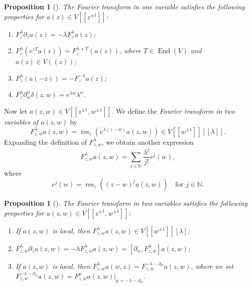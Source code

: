 \documentclass[a4paper, 12pt, reqno]{amsart}
\newtheorem{proposition}[theorem]{Proposition}
\theoremstyle{remark}
\DeclareMathOperator{\End}{End}
\DeclareMathOperator{\res}{res}
\begin{document}
\begin{proposition}[{\cite[Proposition 1.5.2]{nozaradan_introduction_2008}}]
  \label{prp:2}
  The Fourier transform in one variable satisfies the following properties for $a(z) \in V[[z^{\pm1}]]$:
  \begin{enumerate}
  \item $F^{\lambda}_z\partial_za(z) = -\lambda F^{\lambda}_za(z)$;
  \item $F^{\lambda}_z(e^{zT}a(z)) = F^{\lambda + T}_z(a(z))$, where $T \in \End(V)$ and $a(z) \in V((z))$;
  \item $F^{\lambda}_z(a(-z)) = -F^{-\lambda}_za(z)$;
  \item $F^{\lambda}_z\partial^n_w\delta(z, w) = e^{\lambda w}\lambda^n$.
  \end{enumerate}
\end{proposition}

Now let $a(z, w) \in V[[z^{\pm1}, w^{\pm1}]]$.
We define the \emph{Fourier transform in two variables of $a(z, w)$} by
\begin{equation*}
  F^{\lambda}_{z, w}a(z, w) = \res_z(e^{\lambda(z - w)}a(z, w)) \in V[[w^{\pm1}]][[\lambda]].
\end{equation*}
Expanding the definition of $F^{\lambda}_{z, w}$, we obtain another expression
\begin{equation*}
  F^{\lambda}_{z, w}a(z, w) = \sum_{j \in \mathbb{N}}\frac{\lambda^j}{j!}c^j(w),
\end{equation*}
where
\begin{equation*}
  c^j(w) = \res_z((z - w)^ja(z, w)) \quad \text{for $j \in \mathbb{N}$}.
\end{equation*}

\begin{proposition}[{\cite[Proposition 1.5.4]{nozaradan_introduction_2008}}]
  \label{prp:3}
  The Fourier transform in two variables satisfies the following properties for $a(z, w) \in V[[z^{\pm1}, w^{\pm1}]]$:
  \begin{enumerate}
  \item If $a(z, w)$ is local, then $F^{\lambda}_{z, w}a(z, w) \in V[[w^{\pm1}]][\lambda]$;
  \item $F^{\lambda}_{z, w}\partial_za(z, w) = -\lambda F^{\lambda}_{z, w}a(z, w) = [\partial_w, F^{\lambda}_{z, w}]a(z, w)$;
  \item If $a(z, w)$ is local, then $F^{\lambda}_{z, w}a(w, z) = F^{-\lambda - \partial_w}_{z, w}a(z, w)$, where we set $F^{-\lambda - \partial_w}_{z, w}a(z, w) = F^{\mu}_{z, w}a(z, w)|_{\mu = -\lambda - \partial_w}$.
  \end{enumerate}
\end{proposition}
\end{document}
